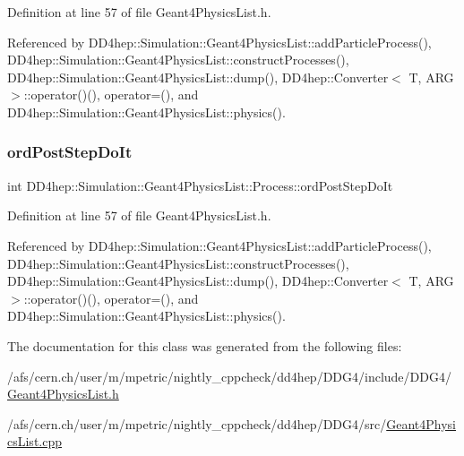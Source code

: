 Definition at line 57 of file Geant4\+Physics\+List.\+h.



Referenced by D\+D4hep\+::\+Simulation\+::\+Geant4\+Physics\+List\+::add\+Particle\+Process(), D\+D4hep\+::\+Simulation\+::\+Geant4\+Physics\+List\+::construct\+Processes(), D\+D4hep\+::\+Simulation\+::\+Geant4\+Physics\+List\+::dump(), D\+D4hep\+::\+Converter$<$ T, A\+R\+G $>$\+::operator()(), operator=(), and D\+D4hep\+::\+Simulation\+::\+Geant4\+Physics\+List\+::physics().

\hypertarget{class_d_d4hep_1_1_simulation_1_1_geant4_physics_list_1_1_process_a5c1ea6f1d3867ef4c1c0a74c7d16783b}{}\label{class_d_d4hep_1_1_simulation_1_1_geant4_physics_list_1_1_process_a5c1ea6f1d3867ef4c1c0a74c7d16783b} 
\subsubsection{\texorpdfstring{ord\+Post\+Step\+Do\+It}{ordPostStepDoIt}}
{\footnotesize\ttfamily int D\+D4hep\+::\+Simulation\+::\+Geant4\+Physics\+List\+::\+Process\+::ord\+Post\+Step\+Do\+It}



Definition at line 57 of file Geant4\+Physics\+List.\+h.



Referenced by D\+D4hep\+::\+Simulation\+::\+Geant4\+Physics\+List\+::add\+Particle\+Process(), D\+D4hep\+::\+Simulation\+::\+Geant4\+Physics\+List\+::construct\+Processes(), D\+D4hep\+::\+Simulation\+::\+Geant4\+Physics\+List\+::dump(), D\+D4hep\+::\+Converter$<$ T, A\+R\+G $>$\+::operator()(), operator=(), and D\+D4hep\+::\+Simulation\+::\+Geant4\+Physics\+List\+::physics().



The documentation for this class was generated from the following files\+:\begin{DoxyCompactItemize}
\item 
/afs/cern.\+ch/user/m/mpetric/nightly\+\_\+cppcheck/dd4hep/\+D\+D\+G4/include/\+D\+D\+G4/\hyperlink{_geant4_physics_list_8h}{Geant4\+Physics\+List.\+h}\item 
/afs/cern.\+ch/user/m/mpetric/nightly\+\_\+cppcheck/dd4hep/\+D\+D\+G4/src/\hyperlink{_geant4_physics_list_8cpp}{Geant4\+Physics\+List.\+cpp}\end{DoxyCompactItemize}
